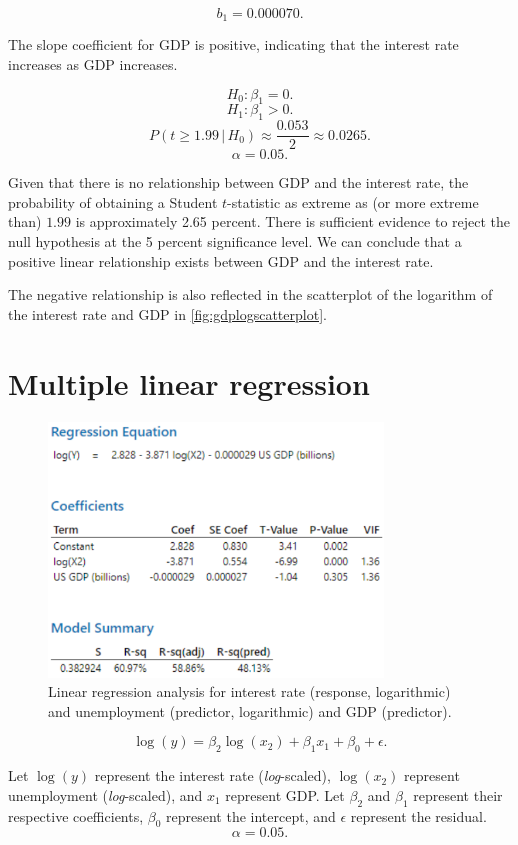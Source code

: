 \documentclass[12pt]{article}
\begin{document}
\[b_1=0.000070.\]

The slope coefficient for GDP is positive, indicating that the interest rate increases as GDP increases.

\[H_0:\beta_1=0.\]
\[H_1:\beta_1>0.\]
\[P(t\geq 1.99\,|\,H_0)\approx\frac{0.053}{2}\approx 0.0265.\]
\[\alpha=0.05.\]

Given that there is no relationship between GDP and the interest rate, the probability of obtaining a Student $t$-statistic as extreme as (or more extreme than) $1.99$ is approximately 2.65 percent. There is sufficient evidence to reject the null hypothesis at the 5 percent significance level. We can conclude that a positive linear relationship exists between GDP and the interest rate.

The negative relationship is also reflected in the scatterplot of the logarithm of the interest rate and GDP in \autoref{fig:gdplogscatterplot}.
\section{Multiple linear regression}
\begin{figure}[h]
\begin{center}
\includegraphics[width=3.5in]{images/log-gdp-log-unemployment-regression.png}
\end{center}
\caption{Linear regression analysis for interest rate (response, logarithmic) and unemployment (predictor, logarithmic) and GDP (predictor).\label{fig:loggdplogunemploymentregression}}
\end{figure}
\[\log(y)=\beta_2\log(x_2)+\beta_1x_1+\beta_0+\epsilon.\]

Let $\log(y)$ represent the interest rate (\textit{log}-scaled), $\log(x_2)$ represent unemployment (\textit{log}-scaled), and $x_1$ represent GDP. Let $\beta_2$ and $\beta_1$ represent their respective coefficients, $\beta_0$ represent the intercept, and $\epsilon$ represent the residual.
\[\alpha=0.05.\]
\end{document}
